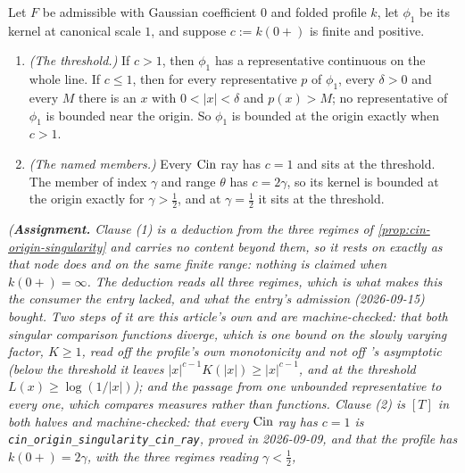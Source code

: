 \begin{corollary}\label{cor:origin-boundedness}
\leanok
Let $F$ be admissible with Gaussian coefficient $0$ and folded profile $k$, let $\phi_1$ be its
kernel at canonical scale $1$, and suppose $c := k(0{+})$ is finite and positive.
\begin{enumerate}
\item \emph{(The threshold.)} If $c > 1$, then $\phi_1$ has a representative continuous on the
whole line. If $c \le 1$, then for every representative $p$ of $\phi_1$, every $\delta > 0$ and
every $M$ there is an $x$ with $0 < |x| < \delta$ and $p(x) > M$; no representative of $\phi_1$
is bounded near the origin. So $\phi_1$ is bounded at the origin exactly when $c > 1$.
\item \emph{(The named members.)} Every $\operatorname{Cin}$ ray has $c = 1$ and sits at the threshold. The
\Matern{} member of index $\gamma$ and range $\theta$ has $c = 2\gamma$, so its kernel is
bounded at the origin exactly for $\gamma > \tfrac12$, and at $\gamma = \tfrac12$ it sits at the
threshold.
\end{enumerate}
\statusA\quad{}\quad\emph{(\textbf{Assignment.} Clause (1) is a deduction from the
three regimes of \ref{prop:cin-origin-singularity} and carries no content beyond them, so it
rests on  exactly as that node does and on the same finite range: nothing is claimed
when $k(0{+}) = \infty$. The deduction reads all three regimes, which is what makes this the
consumer the entry lacked, and what the entry's admission (2026-09-15) bought. Two steps of it
are this article's own and are machine-checked: that both singular comparison functions diverge,
which is one bound on the slowly varying factor, $K \ge 1$, read off the profile's own
monotonicity and not off 's asymptotic (below the threshold it leaves
$|x|^{c-1}K(|x|) \ge |x|^{c-1}$, and at the threshold $L(x) \ge \log(1/|x|)$); and the passage
from \emph{one} unbounded representative to
\emph{every} one, which compares measures rather than functions. Clause (2) is $[T]$ in both
halves and machine-checked: that every $\operatorname{Cin}$ ray has $c = 1$ is
\texttt{cin\_origin\_singularity\_cin\_ray}, proved in 2026-09-09, and that the \Matern{} profile
has $k(0{+}) = 2\gamma$, with the three regimes reading $\gamma < \tfrac12$,
}
\end{corollary}
